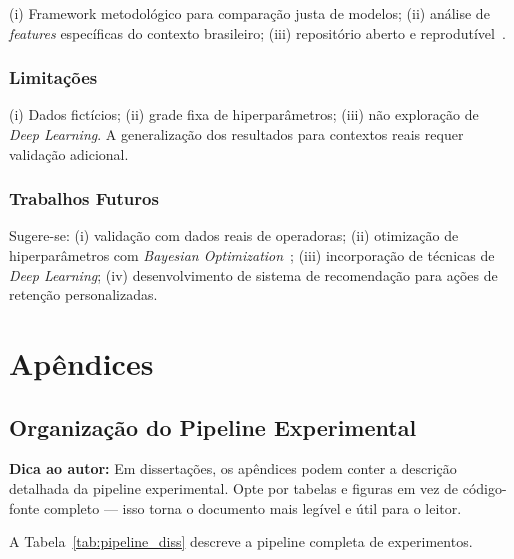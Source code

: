 \documentclass[
    12pt,
    oneside,
    a4paper,
    english,
    brazilian
    ]{abntex2}
\numberwithin{equation}{chapter}
\newenvironment{dica}{%
    \par\medskip
    \color{blue!60!black}\small\itshape
}{%
    \par\medskip
}
\begin{document}
(i) Framework metodológico para comparação justa de modelos; (ii) análise de \textit{features} específicas do contexto brasileiro; (iii) repositório aberto e reprodutível~\cite{moresi2023}.

\section{Limitações}

(i) Dados fictícios; (ii) grade fixa de hiperparâmetros; (iii) não exploração de \textit{Deep Learning}. A generalização dos resultados para contextos reais requer validação adicional.

\section{Trabalhos Futuros}

Sugere-se: (i) validação com dados reais de operadoras; (ii) otimização de hiperparâmetros com \textit{Bayesian Optimization}~\cite{geron2022}; (iii) incorporação de técnicas de \textit{Deep Learning}; (iv) desenvolvimento de sistema de recomendação para ações de retenção personalizadas.

\newpage
{}
{}
\printindex

\newpage
\appendix
\part*{Apêndices}

\chapter{Organização do Pipeline Experimental}

\begin{dica}
\noindent\textbf{Dica ao autor:} Em dissertações, os apêndices podem conter a descrição detalhada da pipeline experimental. Opte por tabelas e figuras em vez de código-fonte completo --- isso torna o documento mais legível e útil para o leitor.
\end{dica}

A Tabela~\ref{tab:pipeline_diss} descreve a pipeline completa de experimentos.
\end{document}
